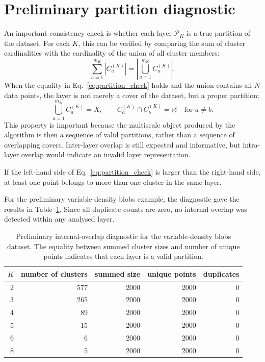 \documentclass[pdflatex,sn-mathphys-num]{sn-jnl}
\newcommand{\calP}{\mathcal{P}}
\begin{document}
\section{Preliminary partition diagnostic}\label{sec:partition_diagnostic}

An important consistency check is whether each layer $\calP_K$ is a true partition of the dataset. For each $K$, this can be verified by comparing the sum of cluster cardinalities with the cardinality of the union of all cluster members:
\begin{equation}
\sum_{a=1}^{m_K}|C_a^{(K)}|=\left|\bigcup_{a=1}^{m_K}C_a^{(K)}\right|.
\label{eq:partition_check}
\end{equation}
When the equality in Eq.~\eqref{eq:partition_check} holds and the union contains all $N$ data points, the layer is not merely a cover of the dataset, but a proper partition:
\begin{equation}
\bigcup_{a=1}^{m_K} C_a^{(K)}=X,
\qquad
C_a^{(K)}\cap C_b^{(K)}=\varnothing
\quad\text{for }a\neq b.
\end{equation}
This property is important because the multiscale object produced by the algorithm is then a sequence of valid partitions, rather than a sequence of overlapping covers. Inter-layer overlap is still expected and informative, but intra-layer overlap would indicate an invalid layer representation.

If the left-hand side of Eq.~\eqref{eq:partition_check} is larger than the right-hand side, at least one point belongs to more than one cluster in the same layer.

For the preliminary variable-density blobs example, the diagnostic gave the results in Table~\ref{tab:partition_diagnostic}. Since all duplicate counts are zero, no internal overlap was detected within any analysed layer.

\begin{table}[t]
\caption{Preliminary internal-overlap diagnostic for the variable-density blobs dataset. The equality between summed cluster sizes and number of unique points indicates that each layer is a valid partition.}\label{tab:partition_diagnostic}
\centering
\begin{tabular}{rrrrr}
\toprule
$K$ & number of clusters & summed size & unique points & duplicates\\
\midrule
2 & 577 & 2000 & 2000 & 0\\
3 & 265 & 2000 & 2000 & 0\\
4 & 89  & 2000 & 2000 & 0\\
5 & 15  & 2000 & 2000 & 0\\
6 & 6   & 2000 & 2000 & 0\\
8 & 5   & 2000 & 2000 & 0\\
\bottomrule
\end{tabular}
\end{table}
\end{document}
